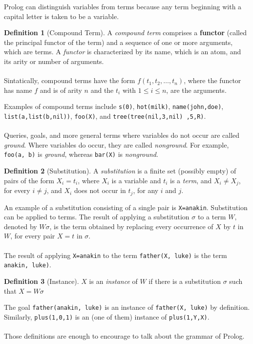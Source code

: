 \documentclass{report}
\theoremstyle{definition}
\theoremstyle{definition}
\newtheorem*{definition*}{Definition}
\newcommand{\ttt}[1]{\texttt{#1}}
\begin{document}
Prolog can distinguish variables from terms because any term beginning with a capital letter is taken to be a variable.
\begin{definition*}[Compound Term]
	A \textit{compound term} comprises a \textbf{functor} (called the principal functor of the term) and a sequence of one or more arguments, which are terms. A \textit{functor} is characterized by its name, which is an atom, and its arity or number of arguments.\\\\
	Sintatically, compound terms have the form $f(t_1, t_2, \ldots, t_n)$, where the functor has name $f$ and is of arity $n$ and the $t_i$ with $1 \leq i \leq n$, are the arguments.
\end{definition*}
Examples of compound terms include \ttt{s(0)}, \ttt{hot(milk)}, \ttt{name(john,doe)}, \ttt{list(a,list(b,nil))}, \ttt{foo(X)}, and \ttt{tree(tree(nil,3,nil) ,5,R)}.\\\\
Queries, goals, and more general terms where variables do not occur are called \textit{ground}. Where variables do occur, they are called \textit{nonground}. For example, \ttt{foo(a, b)} is \textit{ground}, whereas \ttt{bar(X)} is \textit{nonground}.
\begin{definition*}[Substitution]
	A \textit{substitution} is a finite set (possibly empty) of pairs of the form $X_i = t_i$, where $X_i$ is a variable and $t_i$ is a \textit{term}, and $X_i \neq X_j$, for every $i \neq j$, and $X_i$ does not occur in $t_j$, for any $i$ and $j$.
\end{definition*}
An example of a substitution consisting of a single pair is \ttt{X=anakin}. Substitution can be applied to terms. The result of applying a substitution $\sigma$  to a term $W$, denoted by $W \sigma$, is the term obtained by replacing every occurrence of $X$ by $t$ in $W$, for every pair $X=t$ in $\sigma$.\\\\
The result of applying \ttt{X=anakin} to the term \ttt{father(X, luke)} is the term \ttt{anakin, luke)}.
\begin{definition*}[Instance]
	$X$ is an \textit{instance} of $W$ if there is a substitution $\sigma$ such that $X = W \sigma$
\end{definition*}
The goal \ttt{father(anakin, luke)} is an instance of \ttt{father(X, luke)} by definition. Similarly, \ttt{plus(1,0,1)} is an (one of them) instance of \ttt{plus(1,Y,X)}.\\\\
Those definitions are enough to encourage to talk about the grammar of Prolog.
\end{document}
